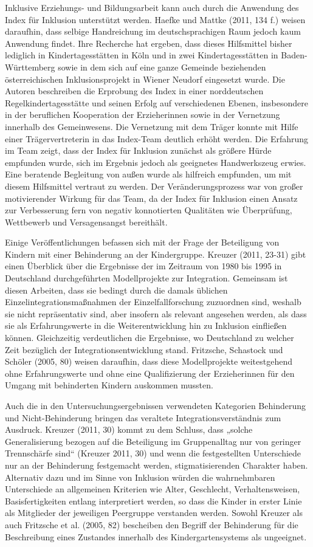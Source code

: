 Inklusive Erziehungs- und Bildungsarbeit kann auch durch die Anwendung des Index für Inklusion unterstützt werden. Haefke und Mattke (2011, 134 f.) weisen daraufhin, dass selbige Handreichung im deutschsprachigen Raum jedoch kaum Anwendung findet. Ihre Recherche hat ergeben, dass dieses Hilfsmittel bisher lediglich in Kindertagesstätten in Köln und in zwei Kindertagesstätten in Baden-Württemberg sowie in dem sich auf eine ganze Gemeinde beziehenden österreichischen Inklusionsprojekt in Wiener Neudorf eingesetzt wurde. Die Autoren beschreiben die Erprobung des Index in einer norddeutschen Regelkindertagesstätte und seinen Erfolg auf verschiedenen Ebenen, insbesondere in der beruflichen Kooperation der Erzieherinnen sowie in der Vernetzung innerhalb des Gemeinwesens. Die Vernetzung mit dem Träger konnte mit Hilfe einer Trägervertreterin in das Index-Team deutlich erhöht werden. Die Erfahrung im Team zeigt, dass der Index für Inklusion zunächst als größere Hürde empfunden wurde, sich im Ergebnis jedoch als geeignetes Handwerkszeug erwies. Eine beratende Begleitung von außen wurde als hilfreich empfunden, um mit diesem Hilfsmittel vertraut zu werden. Der Veränderungsprozess war von großer motivierender Wirkung für das Team, da der Index für Inklusion einen Ansatz zur Verbesserung fern von negativ konnotierten Qualitäten wie Überprüfung, Wettbewerb und Versagensangst bereithält.

Einige Veröffentlichungen befassen sich mit der Frage der Beteiligung von Kindern mit einer Behinderung an der Kindergruppe. Kreuzer (2011, 23-31) gibt einen Überblick über die Ergebnisse der im Zeitraum von 1980 bis 1995 in Deutschland durchgeführten Modellprojekte zur Integration. Gemeinsam ist diesen Arbeiten, dass sie bedingt durch die damals üblichen Einzelintegrationsmaßnahmen der Einzelfallforschung zuzuordnen sind, weshalb sie nicht repräsentativ sind, aber insofern als relevant angesehen werden, als dass sie als Erfahrungswerte in die Weiterentwicklung hin zu Inklusion einfließen können. Gleichzeitig verdeutlichen die Ergebnisse, wo Deutschland zu welcher Zeit bezüglich der Integrationsentwicklung stand. Fritzsche, Schastock und Schöler (2005, 80) weisen daraufhin, dass diese Modellprojekte weitestgehend ohne Erfahrungswerte und ohne eine Qualifizierung der Erzieherinnen für den Umgang mit behinderten Kindern auskommen mussten. 

Auch die in den Untersuchungsergebnissen verwendeten Kategorien Behinderung und Nicht-Behinderung bringen das veraltete Integrationsverständnis zum Ausdruck. Kreuzer (2011, 30) kommt zu dem Schluss, dass „solche Generalisierung bezogen auf die Beteiligung im Gruppenalltag nur von geringer Trennschärfe sind“ (Kreuzer 2011, 30) und wenn die festgestellten Unterschiede nur an der Behinderung festgemacht werden, stigmatisierenden Charakter haben. Alternativ dazu und im Sinne von Inklusion würden die wahrnehmbaren Unterschiede an allgemeinen Kriterien wie Alter, Geschlecht, Verhaltensweisen, Basisfertigkeiten entlang interpretiert werden, so dass die Kinder in erster Linie als Mitglieder der jeweiligen Peergruppe verstanden werden. Sowohl Kreuzer als auch Fritzsche et al. (2005, 82) bescheiben den Begriff der Behinderung für die Beschreibung eines Zustandes innerhalb des Kindergartensystems als ungeeignet. 

